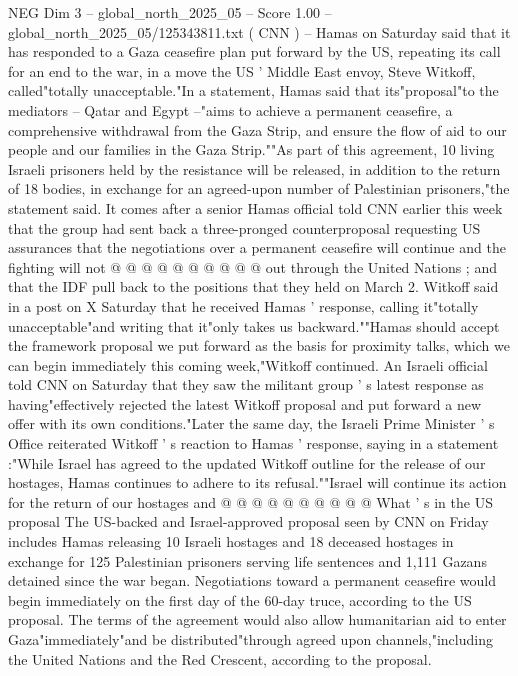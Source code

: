 \begin{textsample}{NEG Dim 3 – global\_north\_2025\_05 – Score 1.00 – global\_north\_2025\_05/125343811.txt}  \label{ex:f3_neg_326}
( CNN ) -- Hamas on Saturday said that it has responded to a Gaza ceasefire plan put forward by the US, repeating its call for an end to the war, in a move the US ' Middle East envoy, Steve Witkoff, called"totally unacceptable."In a statement, Hamas said that its"proposal"to the mediators -- Qatar and Egypt --"aims to achieve a permanent ceasefire, a comprehensive withdrawal from the Gaza Strip, and ensure the flow of aid to our people and our families in the Gaza Strip.""As part of this agreement, 10 living Israeli prisoners held by the resistance will be released, in addition to the return of 18 bodies, in exchange for an agreed-upon number of Palestinian prisoners,"the statement said.
It comes after a senior Hamas official told CNN earlier this week that the group had sent back a three-pronged counterproposal requesting US assurances that the negotiations over a permanent ceasefire will continue and the fighting will not @ @ @ @ @ @ @ @ @ @ out through the United Nations ; and that the IDF pull back to the positions that they held on March 2.
Witkoff said in a post on X Saturday that he received Hamas ' response, calling it"totally unacceptable"and writing that it"only takes us backward.""Hamas should accept the framework proposal we put forward as the basis for proximity talks, which we can begin immediately this coming week,"Witkoff continued.
An Israeli official told CNN on Saturday that they saw the militant group ' s latest response as having"effectively rejected the latest Witkoff proposal and put forward a new offer with its own conditions."Later the same day, the Israeli Prime Minister ' s Office reiterated Witkoff ' s reaction to Hamas ' response, saying in a statement :"While Israel has agreed to the updated Witkoff outline for the release of our hostages, Hamas continues to adhere to its refusal.""Israel will continue its action for the return of our hostages and @ @ @ @ @ @ @ @ @ @ What ' s in the US proposal The US-backed and Israel-approved proposal seen by CNN on Friday includes Hamas releasing 10 Israeli hostages and 18 deceased hostages in exchange for 125 Palestinian prisoners serving life sentences and 1,111 Gazans detained since the war began.
Negotiations toward a permanent ceasefire would begin immediately on the first day of the 60-day truce, according to the US proposal.
The terms of the agreement would also allow humanitarian aid to enter Gaza"immediately"and be distributed"through agreed upon channels,"including the United Nations and the Red Crescent, according to the proposal.

\end{textsample}
